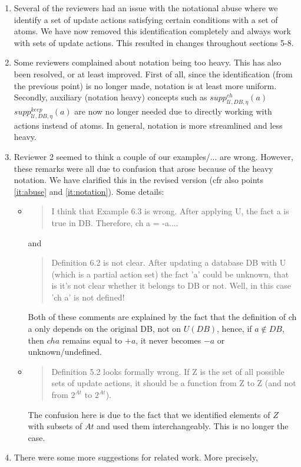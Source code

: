 \documentclass{article}
\begin{document}
\begin{enumerate}
	  \item \label{it:abuse}Several of the reviewers had an issue with the notational abuse where we identify a set of update actions satisfying certain conditions with a set of atoms. We have now removed this identification completely and always work with sets of update actions.  This resulted in changes throughout sections 5-8.
	  \item \label{it:notation} Some reviewers complained about notation being too heavy. This has also been resolved, or at least improved. First of all, since the identification (from the previous point) is no longer made, notation is at least more uniform. Secondly, auxiliary (notation heavy) concepts such as $\mathit{supp}_{\mathcal{U},\mathit{DB},\eta}^{ch}(a)$ $\mathit{supp}_{\mathcal{U},\mathit{DB},\eta}^{keep}(a)$ are now no longer needed due to directly working with actions instead of atoms. In general, notation is more streamlined and less heavy. 
	  \item Reviewer 2 seemed to think a couple of our examples/... are wrong. However, these remarks were all due to confusion that arose because of the heavy notation. 
	  We have clarified this in the revised version (cfr also points \ref{it:abuse} and \ref{it:notation}). Some details: 
	  \begin{itemize}
	  \item \begin{quote}I think that Example 6.3 is wrong. After applying U, the fact a is true in DB.
Therefore, ch a = -a.... \end{quote} and 
\begin{quote}
 Definition 6.2 is not clear. After updating a database DB with U (which is a partial action set) the
fact 'a' could be unknown, that is it's not clear whether it belongs to DB or not.
Well, in this case 'ch a' is not defined!
\end{quote}
Both of these comments are explained by the fact that the definition of ch a only depends on the original DB, not on $U(DB)$, hence, if $a\not\in DB$, then  $ch a$ remains equal to $+a$, it never becomes $-a$ or unknown/undefined. 
	  \item \begin{quote}
	         Definition 5.2 looks formally wrong. If Z is the set of all possible sets of update actions, it should be a function from Z to Z (and not from $2^{At}$ to $2^{At}$).
	        \end{quote}
	         The confusion here is due to the fact that we identified elements of $Z$  with subsets of $At$ and used them interchangeably. This is no longer the case.
	      
\end{itemize}
\item There were some more suggestions for related work. More precisely, 

	  \end{enumerate}
\end{document}
